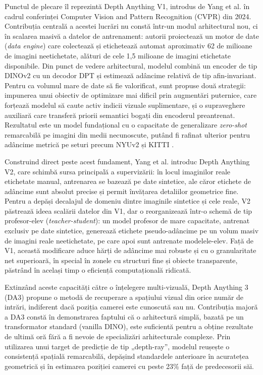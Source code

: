 \par Punctul de plecare îl reprezintă Depth Anything V1, introdus de Yang et al. \cite{yang2024depthv1} în cadrul conferinței Computer Vision and Pattern Recognition (CVPR) din 2024. Contribuția centrală a acestei lucrări nu constă într-un modul arhitectural nou, ci în scalarea masivă a datelor de antrenament: autorii proiectează un motor de date (\emph{data engine}) care colectează și etichetează automat aproximativ 62 de milioane de imagini neetichetate, alături de cele 1{,}5 milioane de imagini etichetate disponibile. Din punct de vedere arhitectural, modelul combină un encoder de tip DINOv2 \cite{oquab2024dinov2} cu un decodor DPT și estimează adâncime relativă de tip afin-invariant. Pentru ca volumul mare de date să fie valorificat, sunt propuse două strategii: impunerea unui obiectiv de optimizare mai dificil prin augmentări puternice, care forțează modelul să caute activ indicii vizuale suplimentare, și o supraveghere auxiliară care transferă priorii semantici bogați din encoderul preantrenat. Rezultatul este un model fundațional cu o capacitate de generalizare \emph{zero-shot} remarcabilă pe imagini din medii necunoscute, putând fi rafinat ulterior pentru adâncime metrică pe seturi precum NYUv2 \cite{silberman2012nyuv2} și KITTI \cite{geiger2012kitti}.

\par Construind direct peste acest fundament, Yang et al. \cite{yang2024depth} introduc Depth Anything V2, care schimbă sursa principală a supervizării: în locul imaginilor reale etichetate manual, antrenarea se bazează pe date sintetice, ale căror etichete de adâncime sunt absolut precise și permit învățarea detaliilor geometrice fine. Pentru a depăși decalajul de domeniu dintre imaginile sintetice și cele reale, V2 păstrează ideea scalării datelor din V1, dar o reorganizează într-o schemă de tip profesor-elev (\emph{teacher-student}): un model profesor de mare capacitate, antrenat exclusiv pe date sintetice, generează etichete pseudo-adâncime pe un volum masiv de imagini reale neetichetate, pe care apoi sunt antrenate modelele-elev. Față de V1, această modificare aduce hărți de adâncime mai robuste și cu o granularitate net superioară, în special în zonele cu structuri fine și obiecte transparente, păstrând în același timp o eficiență computațională ridicată.

Extinzând aceste capacități către o înțelegere multi-vizuală, Depth Anything 3 (DA3) \cite{depthanything3} propune o metodă de recuperare a spațiului vizual din orice număr de intrări, indiferent dacă poziția camerei este cunoscută sau nu. Contribuția majoră a DA3 constă în demonstrarea faptului că o arhitectură simplă, bazată pe un transformator standard (vanilla DINO), este suficientă pentru a obține rezultate de ultimă oră fără a fi nevoie de specializări arhitecturale complexe. Prin utilizarea unui target de predicție de tip „depth-ray”, modelul reușește o consistență spațială remarcabilă, depășind standardele anterioare în acuratețea geometrică și în estimarea poziției camerei cu peste 23\% față de predecesorii săi.

